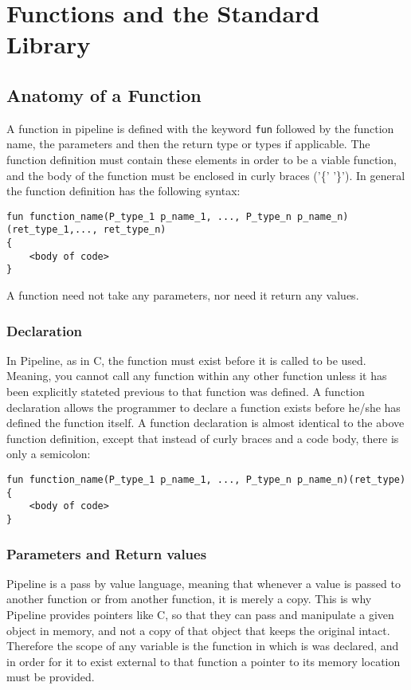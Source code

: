 \documentclass[./LRM_main.tex]{subfiles}
\begin{document}


\chapter{Functions and the Standard Library}
\section{Anatomy of a Function}
A function in pipeline is defined with the keyword \texttt{fun} followed by the function name, the parameters and then the return type or types if applicable. The function definition must contain these elements in order to be a viable function, and the body of the function must be enclosed in curly braces ('\{' '\}'). In general the function definition has the following syntax:
\begin{lstlisting}
fun function_name(P_type_1 p_name_1, ..., P_type_n p_name_n)(ret_type_1,..., ret_type_n)
{
	<body of code>
}
\end{lstlisting}
A function need not take any parameters, nor need it return any values.
\subsection{Declaration}
In Pipeline, as in C, the function must exist before it is called to be used. Meaning, you cannot call any function within any other function unless it has been explicitly stateted previous to that function was defined. A function declaration allows the programmer to declare a function exists before he/she has defined the function itself. A function declaration is almost identical to the above function definition, except that instead of curly braces and a code body, there is only a semicolon:
\begin{lstlisting}
fun function_name(P_type_1 p_name_1, ..., P_type_n p_name_n)(ret_type)
{
	<body of code>
}
\end{lstlisting}
\subsection{Parameters and Return values}
Pipeline is a pass by value language, meaning that whenever a value is passed to another function or from another function, it is merely a copy. This is why Pipeline provides pointers like C, so that they can pass and manipulate a given object in memory, and not a copy of that object that keeps the original intact. Therefore the scope of any variable is the function in which is was declared, and in order for it to exist external to that function a pointer to its memory location must be provided.
\end{document}
